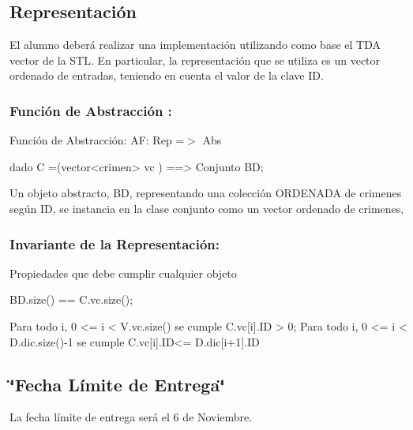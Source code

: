 \hypertarget{index_rep}{}\subsection{Representación}\label{index_rep}
El alumno deberá realizar una implementación utilizando como base el T\-D\-A vector de la S\-T\-L. En particular, la representación que se utiliza es un vector ordenado de entradas, teniendo en cuenta el valor de la clave I\-D.\hypertarget{index_fact_sec2}{}\subsubsection{Función de Abstracción \-:}\label{index_fact_sec2}
Función de Abstracción\-: A\-F\-: Rep =$>$ Abs \begin{DoxyVerb}dado C =(vector<crimen> vc ) ==> Conjunto BD;
\end{DoxyVerb}


Un objeto abstracto, B\-D, representando una colección O\-R\-D\-E\-N\-A\-D\-A de crimenes según I\-D, se instancia en la clase conjunto como un vector ordenado de crimenes,\hypertarget{index_inv_sec2}{}\subsubsection{Invariante de la Representación\-:}\label{index_inv_sec2}
Propiedades que debe cumplir cualquier objeto


\begin{DoxyCode}
BD.size() == C.vc.size();

Para todo i, 0 <= i < V.vc.size() se cumple
    C.vc[i].ID > 0;
Para todo i, 0 <= i < D.dic.size()-1 se cumple
    C.vc[i].ID<= D.dic[i+1].ID
\end{DoxyCode}
\hypertarget{index_fecha}{}\subsection{\char`\"{}\-Fecha Límite de Entrega\char`\"{}}\label{index_fecha}
La fecha límite de entrega será el 6 de Noviembre. 